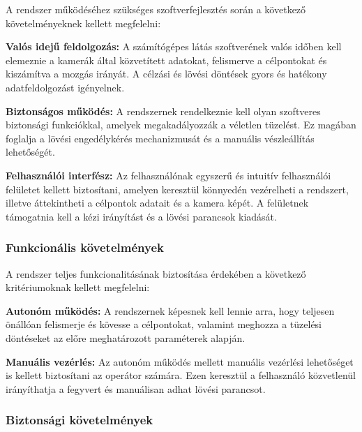 \documentclass[12pt,a4paper]{article}
\begin{document}
A rendszer működéséhez szükséges szoftverfejlesztés során a következő követelményeknek kellett megfelelni:

\begin{list}{}{}
	\item \textbf{Valós idejű feldolgozás:}  A számítógépes látás szoftverének valós időben kell elemeznie a kamerák által közvetített adatokat, felismerve a célpontokat és kiszámítva a mozgás irányát. A célzási és lövési döntések gyors és hatékony adatfeldolgozást igényelnek.
	\item \textbf{Biztonságos működés:} A rendszernek rendelkeznie kell olyan szoftveres biztonsági funkciókkal, amelyek megakadályozzák a véletlen tüzelést. Ez magában foglalja a lövési engedélykérés mechanizmusát és a manuális vészleállítás lehetőségét.
	\item \textbf{Felhasználói interfész:} Az felhasználónak egyszerű és intuitív felhasználói felületet kellett biztosítani, amelyen keresztül könnyedén vezérelheti a rendszert, illetve áttekintheti a célpontok adatait és a kamera képét. A felületnek támogatnia kell a kézi irányítást és a lövési parancsok kiadását.
\end{list}



 
\subsubsection*{Funkcionális követelmények}

A rendszer teljes funkcionalitásának biztosítása érdekében a következő kritériumoknak kellett megfelelni:

\begin{list}{}{}
	\item \textbf{Autonóm működés:} A rendszernek képesnek kell lennie arra, hogy teljesen önállóan felismerje és kövesse a célpontokat, valamint meghozza a tüzelési döntéseket az előre meghatározott paraméterek alapján.
	\item \textbf{Manuális vezérlés:} Az autonóm működés mellett manuális vezérlési lehetőséget is kellett biztosítani az operátor számára. Ezen keresztül a felhasználó közvetlenül irányíthatja a fegyvert és manuálisan adhat lövési parancsot.
\end{list}

\subsubsection*{Biztonsági követelmények}
\end{document}
